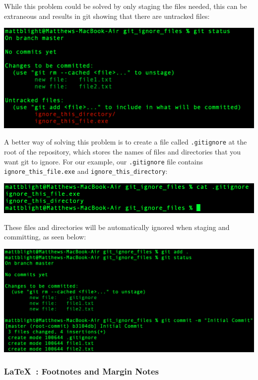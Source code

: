 \documentclass[a4paper, 11pt]{report}
\begin{document}
While this problem could be solved by only staging the files needed, this can be extraneous and results in git showing that there are untracked files:

\includegraphics[width=\textwidth]{ignore1}

A better way of solving this problem is to create a file called \verb|.gitignore| at the root of the repository, which stores the names of files and directories that you want git to ignore. For our example, our \verb|.gitignore| file contains \verb|ignore_this_file.exe| and \verb|ignore_this_directory|: 

\includegraphics[width=\textwidth]{ignore2}

These files and directories will be automatically ignored when staging and committing, as seen below:

\includegraphics[width=\textwidth]{ignore3}


\newpage


\subsubsection{\LaTeX\ : Footnotes and Margin Notes \cite{footnotes}}
\end{document}
